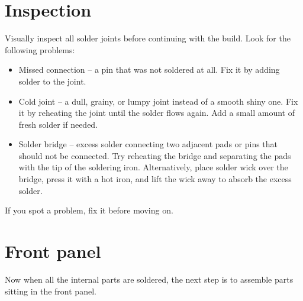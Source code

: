 \documentclass[10pt,a4paper,twocolumn]{article}
\begin{document}
\section{Inspection}
\label{inspection}

Visually inspect all solder joints before continuing with the build. Look for the following problems:

\begin{itemize}
  \item Missed connection -- a pin that was not soldered at all. Fix it by adding solder to the joint.
  \item Cold joint -- a dull, grainy, or lumpy joint instead of a smooth shiny one. Fix it by reheating the joint until the solder flows again. Add a small amount of fresh solder if needed.
  \item Solder bridge -- excess solder connecting two adjacent pads or pins that should not be connected. Try reheating the bridge and separating the pads with the tip of the soldering iron. Alternatively, place solder wick over the bridge, press it with a hot iron, and lift the wick away to absorb the excess solder.
\end{itemize}

If you spot a problem, fix it before moving on.

\newpage

\section{Front panel}

Now when all the internal parts are soldered, the next step is to assemble
parts sitting in the front panel.
\end{document}
